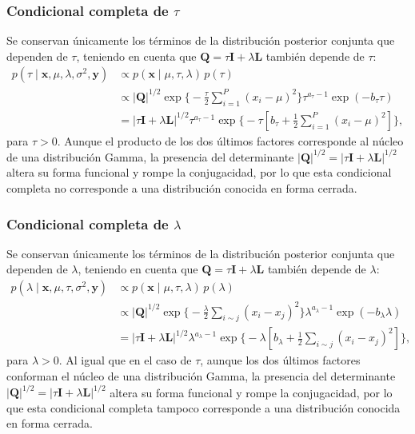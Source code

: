 \documentclass[11pt,a4paper]{article}
\begin{document}
\subsubsection*{Condicional completa de $\tau$}

Se conservan únicamente los términos de la distribución posterior conjunta que dependen de $\tau$, teniendo en cuenta que $\mathbf{Q} = \tau\mathbf{I} + \lambda\mathbf{L}$ también depende de $\tau$:
\begin{align*}
p(\tau \mid \boldsymbol{x}, \mu, \lambda, \sigma^2, \boldsymbol{y})
&\propto p(\boldsymbol{x} \mid \mu, \tau, \lambda)\, p(\tau) \\[6pt]
&\propto |\mathbf{Q}|^{1/2} \exp\Big\{ -\frac{\tau}{2}\sum_{i=1}^{P}(x_i - \mu)^2 \Big\} \tau^{a_\tau - 1} \exp(-b_\tau \tau) \\[6pt]
&= |\tau\mathbf{I} + \lambda\mathbf{L}|^{1/2} \tau^{a_\tau - 1} \exp\Big\{ -\tau\left[ b_\tau + \frac{1}{2}\sum_{i=1}^{P}(x_i - \mu)^2 \right] \Big\},
\end{align*}
para $\tau > 0$. Aunque el producto de los dos últimos factores corresponde al núcleo de una distribución Gamma, la presencia del determinante $|\mathbf{Q}|^{1/2} = |\tau\mathbf{I} + \lambda\mathbf{L}|^{1/2}$ altera su forma funcional y rompe la conjugacidad, por lo que esta condicional completa no corresponde a una distribución conocida en forma cerrada.

\subsubsection*{Condicional completa de $\lambda$}

Se conservan únicamente los términos de la distribución posterior conjunta que dependen de $\lambda$, teniendo en cuenta que $\mathbf{Q} = \tau\mathbf{I} + \lambda\mathbf{L}$ también depende de $\lambda$:
\begin{align*}
p(\lambda \mid \boldsymbol{x}, \mu, \tau, \sigma^2, \boldsymbol{y})
&\propto p(\boldsymbol{x} \mid \mu, \tau, \lambda)\, p(\lambda) \\[6pt]
&\propto |\mathbf{Q}|^{1/2} \exp\Big\{ -\frac{\lambda}{2}\sum_{i \sim j}(x_i - x_j)^2 \Big\} \lambda^{a_\lambda - 1} \exp(-b_\lambda \lambda) \\[6pt]
&= |\tau\mathbf{I} + \lambda\mathbf{L}|^{1/2} \lambda^{a_\lambda - 1} \exp\Big\{ -\lambda\left[ b_\lambda + \frac{1}{2}\sum_{i \sim j}(x_i - x_j)^2 \right] \Big\},
\end{align*}
para $\lambda > 0$. Al igual que en el caso de $\tau$, aunque los dos últimos factores conforman el núcleo de una distribución Gamma, la presencia del determinante $|\mathbf{Q}|^{1/2} = |\tau\mathbf{I} + \lambda\mathbf{L}|^{1/2}$ altera su forma funcional y rompe la conjugacidad, por lo que esta condicional completa tampoco corresponde a una distribución conocida en forma cerrada.
\end{document}
